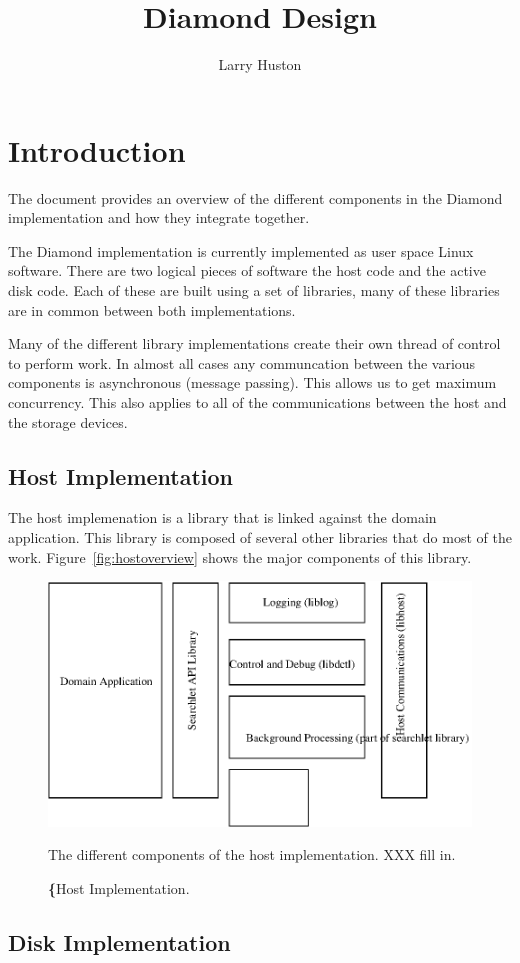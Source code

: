 \documentclass{article}
\title{Diamond Design}
\author{
  Larry Huston
}
\begin{document}
\maketitle


\section{Introduction}
\label{Introduction}

The document provides an overview of the different components 
in the Diamond implementation and how they integrate together.

The Diamond implementation is currently implemented as user
space Linux software.   There are two logical pieces of
software the host code and the active disk code.  Each of these
are built using a set of libraries, many of these libraries are
in common between both implementations.

Many of the different library implementations create their
own thread of control to perform work.  In almost all
cases any communcation between the various components
is asynchronous (message passing).  This allows us
to get maximum concurrency.  This also applies to all
of the communications between the host and the storage devices.


\subsection{Host Implementation}

The host implemenation is a library that is linked against the domain
application.  This library is composed of several other libraries
that do most of the work.  Figure~\ref{fig:hostoverview} shows
the major components of this library.

\begin{figure}[tbp]
\begin{center}
\includegraphics[width=\linewidth]{pics/host_structure}%
\end{center}
\caption{\textbf\{Host Implementation.}
The different components of the host implementation.
XXX fill in.
\label{fig:hostoeverview}
\end{figure}
                                                                                


\subsection{Disk Implementation}
\end{document}
